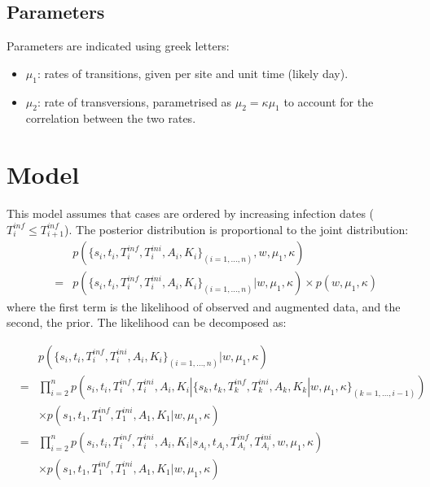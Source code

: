 \documentclass[10pt]{article}
\begin{document}
\subsection*{Parameters}
Parameters are indicated using greek letters:
\begin{itemize}
	\item $\mu_1$: rates of transitions, given per site and unit time (likely day).
	\item $\mu_2 $: rate of transversions, parametrised as $\mu_2 = \kappa \mu_1$ to account for the correlation between the two rates.
\end{itemize}






\section*{Model}
This model assumes that cases are ordered by increasing infection dates ($T_i^{inf} \leq T_{i+1}^{inf}$).
The posterior distribution is proportional to the joint distribution:
\begin{eqnarray}
& & p(\{s_i, t_i, T_i^{inf},T_i^{ini}, A_i, K_i\}_{(i=1,\ldots,n)}, w, \mu_1, \kappa)\\
& = & p(\{s_i, t_i, T_i^{inf},T_i^{ini}, A_i, K_i\}_{(i=1,\ldots,n)}| w, \mu_1, \kappa) \times p(w, \mu_1, \kappa)
\end{eqnarray}
where the first term is the likelihood of observed and augmented data, and the second, the prior.
The likelihood can be decomposed as:

\begin{eqnarray}
& & p(\{s_i, t_i, T_i^{inf},T_i^{ini}, A_i, K_i\}_{(i=1,\ldots,n)}| w, \mu_1, \kappa) \\
& = & \prod_{i=2}^n p(s_i, t_i, T_i^{inf},T_i^{ini}, A_i, K_i | \{s_k, t_k, T_k^{inf},T_k^{ini}, A_k, K_k | w, \mu_1, \kappa\}_{(k=1,\ldots,i-1)}) \nonumber \\ 
& & \times p(s_1, t_1, T_1^{inf}, T_1^{ini}, A_1, K_1 | w, \mu_1, \kappa)\\
& = & \prod_{i=2}^n p(s_i, t_i, T_i^{inf},T_i^{ini}, A_i, K_i| s_{A_i}, t_{A_i}, T_{A_i}^{inf}, T_{A_i}^{ini}, w, \mu_1, \kappa) \nonumber \\
& & \times p(s_1, t_1, T_1^{inf}, T_1^{ini},A_1, K_1 | w, \mu_1, \kappa)
\end{eqnarray}
\end{document}
